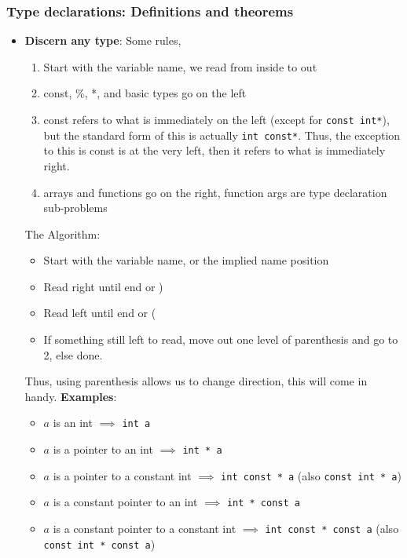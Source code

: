 \documentclass{report}
\begin{document}
    \subsubsection{Type declarations: Definitions and theorems}
    \begin{itemize}
        \item \textbf{Discern any type}: Some rules,
            \begin{enumerate}
                \item Start with the variable name, we read from inside to out
                \item const, \%, *, and basic types go on the left
                \item const refers to what is immediately on the left (except for \texttt{const int*}), but the standard form of this is actually \texttt{int const*}. Thus, the exception to this is const is at the very left, then it refers to what is immediately right.
                \item arrays and functions go on the right, function args are type declaration sub-problems
            \end{enumerate}
            The Algorithm:
            \begin{itemize}
                \item Start with the variable name, or the implied name position 
                \item Read right until end or )
                \item Read left until end or (
                \item If something still left to read, move out one level of parenthesis and go to 2, else done.
            \end{itemize}
            \bigbreak \noindent 
            Thus, using parenthesis allows us to change direction, this will come in handy.
            \bigbreak \noindent 
            \textbf{Examples}:
            \begin{itemize}
                \item  $a$ is an int $\implies$ \texttt{int a}
                \item $a$ is a pointer to an int $\implies$ \texttt{int * a}
                \item $a$ is a pointer to a constant int $\implies$ \texttt{int const * a} (also \texttt{const int * a})
                \item $a$ is a constant pointer to an int $\implies$ \texttt{int * const a}
                \item $a$ is a constant pointer to a constant int $\implies$ \texttt{int const * const a} (also \texttt{const int * const a})

\end{itemize}
\end{itemize}
\end{document}
